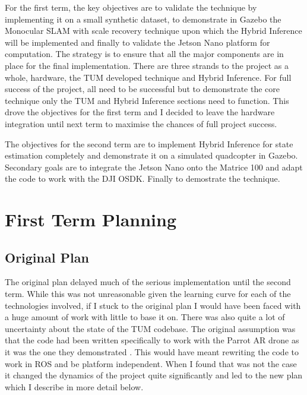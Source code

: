 \documentclass[]{../resources/final_report}
\begin{document}
For the first term, the key objectives are to validate the technique by implementing it on a small synthetic dataset, to demonstrate in Gazebo the Monocular SLAM with scale recovery technique \cite{Engel:Camera-basedNav} upon which the Hybrid Inference will be implemented and finally to validate the Jetson Nano platform for computation.
The strategy is to ensure that all the major components are in place for the final implementation. There are three strands to the project as a whole, hardware, the TUM developed technique and Hybrid Inference.
For full success of the project, all need to be successful but to demonstrate the core technique only the TUM and Hybrid Inference sections need to function. This drove the objectives for the first term and I decided to leave the hardware integration until next term to maximise the chances of full project success.

The objectives for the second term are to implement Hybrid Inference for state estimation completely and demonstrate it on a simulated quadcopter in Gazebo. Secondary goals are to integrate the Jetson Nano onto the Matrice 100 and adapt the code to work with the DJI OSDK. Finally to demostrate the technique.

\chapter{First Term Planning}

\section{Original Plan}

The original plan delayed much of the serious implementation until the second term. While this was not unreasonable given the learning curve for each of the technologies involved, if I stuck to the original plan I would have been faced with a huge amount of work with little to base it on.
There was also quite a lot of uncertainty about the state of the TUM codebase. The original assumption was that the code had been written specifically to work with the Parrot AR drone as it was the one they demonstrated \cite{Engel:Camera-basedNav}.
This would have meant rewriting the code to work in ROS and be platform independent. When I found that was not the case it changed the dynamics of the project quite significantly and led to the new plan which I describe in more detail below.
\end{document}

